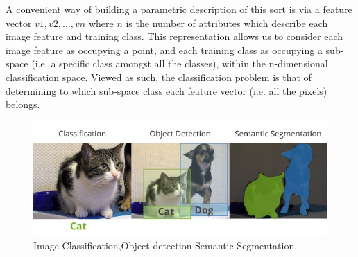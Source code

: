 A convenient way of building a parametric description of this sort is via a feature vector $v1,v2,\dots,vn$ where $n$ is the number of attributes which describe each image feature and training class. This representation allows us to consider each image feature as occupying a point, and each training class as occupying a sub-space (i.e. a specific class amongst all the classes), within the n-dimensional classification space. Viewed as such, the classification problem is that of determining to which sub-space class each feature vector (i.e. all the pixels) belongs.
\begin{figure}[H]
	\centering
	\includegraphics[width=0.7\linewidth]{images/classification_detection_segmentaion_comparisons.jpeg}
	\caption{Image Classification,Object detection Semantic Segmentation.}
\end{figure}
